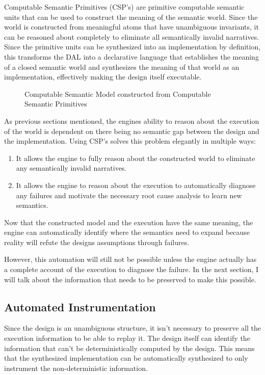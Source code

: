 Computable Semantic Primitives (CSP's) are primitive computable semantic units that can be used to construct the meaning of the semantic world. Since the world is constructed from meaningful atoms that have unambiguous invariants, it can be reasoned about completely to eliminate all semantically invalid narratives. Since the primitive units can be synthesized into an implementation by definition, this transforms the DAL into a declarative language that establishes the meaning of a closed semantic world and synthesizes the meaning of that world as an implementation, effectively making the design itself executable.

\begin{figure}[htbp]
    \centering
    
    \caption{Computable Semantic Model constructed from Computable Semantic Primitives}
    \label{fig:csp}
\end{figure}

As previous sections mentioned, the engines ability to reason about the execution of the world is dependent on there being no semantic gap between the design and the implementation. Using CSP's solves this problem elegantly in multiple ways:
\begin{enumerate}
    \item It allows the engine to fully reason about the constructed world to eliminate any semantically invalid narratives. 
    \item It allows the engine to reason about the execution to automatically diagnose any failures and motivate the necessary root cause analysis to learn new semantics.
\end{enumerate}

Now that the constructed model and the execution have the same meaning, the engine can automatically identify where the semantics need to expand because reality will refute the designs assumptions through failures. 

However, this automation will still not be possible unless the engine actually has a complete account of the execution to diagnose the failure. In the next section, I will talk about the information that needs to be preserved to make this possible.

\subsection{Automated Instrumentation}

Since the design is an unambiguous structure, it isn't necessary to preserve all the execution information to be able to replay it. The design itself can identify the information that can't be deterministically computed by the design. This means that the synthesized implementation can be automatically synthesized to only instrument the non-deterministic information.

